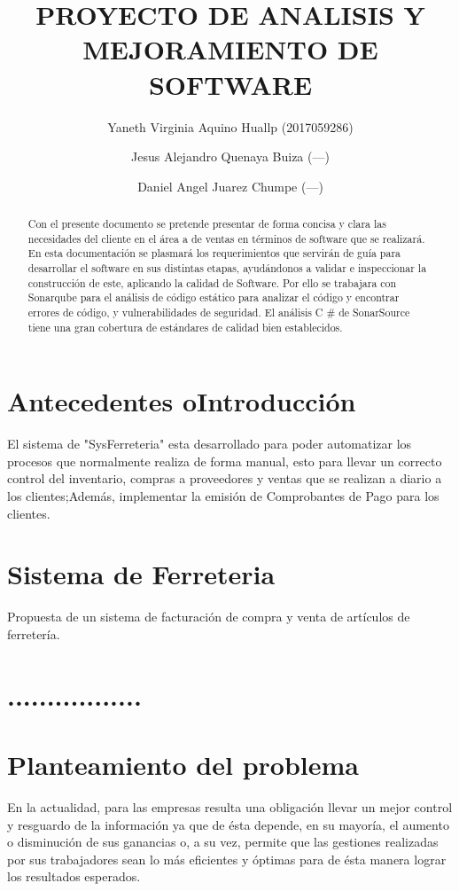 \documentclass[preprint,12pt]{elsarticle}
\begin{document}
	
	\begin{frontmatter}

		\title{\huge  PROYECTO DE  ANALISIS Y  MEJORAMIENTO DE  SOFTWARE }
		\author{Yaneth Virginia Aquino Huallp                (2017059286)}
		\author{Jesus Alejandro Quenaya Buiza              (---)}
		\author{Daniel Angel Juarez Chumpe              (---)}
		\address{Tacna, Perú}
		


\begin{abstract}
Con el presente documento se pretende presentar de forma concisa y clara las necesidades del cliente en el área a de ventas en términos de software que se realizará. 
En esta documentación se plasmará los requerimientos que servirán de guía para desarrollar el software en sus distintas etapas, ayudándonos a validar e inspeccionar la construcción de este, aplicando la calidad de Software.
Por ello se trabajara con  Sonarqube para el análisis de código estático
para analizar el código y encontrar errores de código, y vulnerabilidades de seguridad. 
El análisis C # de SonarSource tiene una gran cobertura de estándares de calidad bien establecidos.  
\end{abstract}


\end{frontmatter}
\section{Antecedentes oIntroducción}

El sistema de "SysFerreteria" esta desarrollado para poder automatizar los procesos que
normalmente realiza de forma manual, esto para llevar un correcto control del
inventario, compras a proveedores y ventas que se realizan a diario a los clientes;Además, implementar la emisión de Comprobantes de Pago para  los clientes.

\section{Sistema de Ferreteria}
Propuesta de un sistema de facturación de  compra y venta
de artículos de ferretería.
\section{.................}
\section{Planteamiento del problema}
En la actualidad, para las empresas resulta una obligación llevar un mejor control y resguardo
de la información ya que de ésta depende, en su mayoría, el aumento o disminución de sus
ganancias o, a su vez, permite que las gestiones realizadas por sus trabajadores sean lo más
eficientes y óptimas para de ésta manera lograr los resultados esperados.
\end{document}
